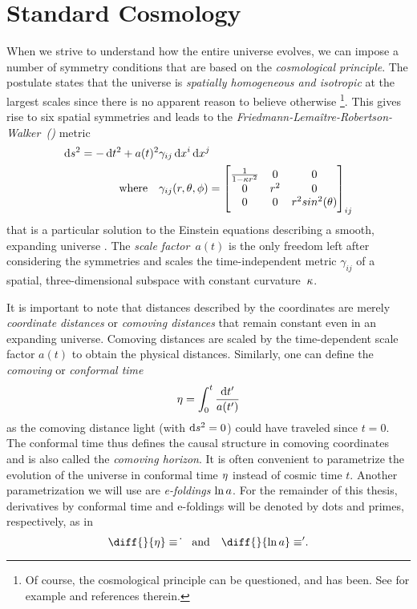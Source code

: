 \section{Standard \FLRW{} Cosmology}\label{sec:frw}

When we strive to understand how the entire universe evolves, we can impose a number of symmetry conditions that are based on the \emph{cosmological principle}. The postulate states that the universe is \emph{spatially homogeneous and isotropic} at the largest scales since there is no apparent reason to believe otherwise \footnote{Of course, the cosmological principle can be questioned, and has been. See for example \textcite{Schwarz2015} and references therein.}. This gives rise to six spatial symmetries and leads to the \emph{Friedmann-Lemaître-Robertson-Walker~(\FLRW{})} metric%
\begin{subequations}%
\begin{align}%
	\dif{s}^2 = -\dif{t}^2 + a(t)^2 &\gamma_{ij} \dif{x^i}\dif{x^j} \\
	\text{where} \quad &\gamma_{ij}(r,\theta,\phi) =
	\begin{bmatrix}
		\frac{1}{1-\spatcurv r^2} & 0 & 0 \\
		0 & r^2 & 0 \\
		0 & 0 & r^2 sin^2(\theta)
	\end{bmatrix}_{ij}
\end{align}
\end{subequations}
that is a particular solution to the Einstein equations describing a smooth, expanding universe \autocite{Dodelson,Schuller}. The \emph{scale factor}~\(a(t)\) is the only freedom left after considering the symmetries and scales the time-independent metric \(\gamma_{ij}\) of a spatial, three-dimensional subspace with constant curvature~\(\kappa\).

It is important to note that distances described by the \FLRW{} coordinates are merely \emph{coordinate distances} or \emph{comoving distances} that remain constant even in an expanding universe. Comoving distances are scaled by the time-dependent scale factor \(a(t)\) to obtain the physical distances. Similarly, one can define the \emph{comoving} or \emph{conformal time}
\begin{equation}
	\conft = \int_0^t \frac{\dif{t^\prime}}{a(t^\prime)}
\end{equation}
as the comoving distance light (with \(\dif{s}^2=0\)) could have traveled since \(t=0\). The conformal time thus defines the causal structure in comoving coordinates and is also called the \emph{comoving horizon}. It is often convenient to parametrize the evolution of the universe in conformal time \(\eta\) instead of cosmic time \(t\). Another parametrization we will use are \emph{e-foldings} \(\ln a\). For the remainder of this thesis, derivatives by conformal time and e-foldings will be denoted by dots and primes, respectively, as in
\begin{equation}
	\diff{}{\conft}\equiv\dconf{} \quad \text{and} \quad \diff{}{\efold}\equiv\defold{}
	\eqpunct{.}
\end{equation}

